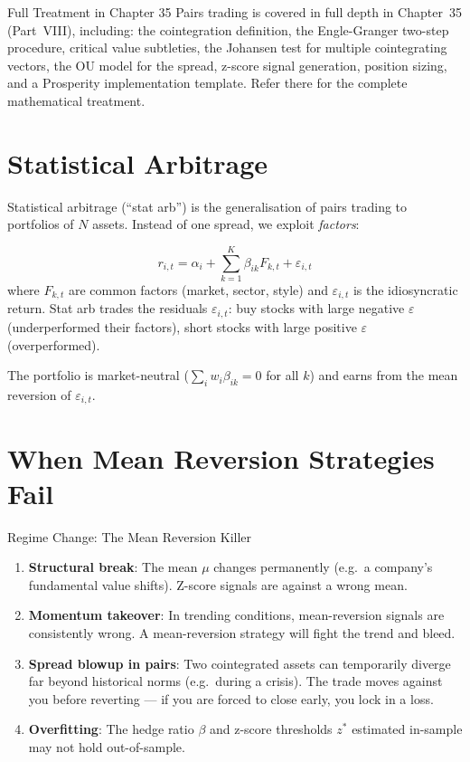 \documentclass[12pt,a4paper,openany]{report}
\theoremstyle{definition}
\begin{document}
\begin{keyconceptbox}{Full Treatment in Chapter 35}
Pairs trading is covered in full depth in Chapter~35 (Part~VIII), including: the cointegration definition, the Engle-Granger two-step procedure, critical value subtleties, the Johansen test for multiple cointegrating vectors, the OU model for the spread, z-score signal generation, position sizing, and a Prosperity implementation template. Refer there for the complete mathematical treatment.
\end{keyconceptbox}

\section{Statistical Arbitrage}

Statistical arbitrage (``stat arb'') is the generalisation of pairs trading to portfolios of $N$ assets. Instead of one spread, we exploit \emph{factors}:

\begin{equation}
  r_{i,t} = \alpha_i + \sum_{k=1}^K \beta_{ik} F_{k,t} + \varepsilon_{i,t}
\end{equation}
where $F_{k,t}$ are common factors (market, sector, style) and $\varepsilon_{i,t}$ is the idiosyncratic return. Stat arb trades the residuals $\varepsilon_{i,t}$: buy stocks with large negative $\varepsilon$ (underperformed their factors), short stocks with large positive $\varepsilon$ (overperformed).

The portfolio is market-neutral ($\sum_i w_i \beta_{ik} = 0$ for all $k$) and earns from the mean reversion of $\varepsilon_{i,t}$.

\section{When Mean Reversion Strategies Fail}

\begin{warningbox}{Regime Change: The Mean Reversion Killer}
\begin{enumerate}[label=\arabic*.]
  \item \textbf{Structural break}: The mean $\mu$ changes permanently (e.g.\ a company's fundamental value shifts). Z-score signals are against a wrong mean.
  \item \textbf{Momentum takeover}: In trending conditions, mean-reversion signals are consistently wrong. A mean-reversion strategy will fight the trend and bleed.
  \item \textbf{Spread blowup in pairs}: Two cointegrated assets can temporarily diverge far beyond historical norms (e.g.\ during a crisis). The trade moves against you before reverting — if you are forced to close early, you lock in a loss.
  \item \textbf{Overfitting}: The hedge ratio $\beta$ and z-score thresholds $z^*$ estimated in-sample may not hold out-of-sample.
\end{enumerate}
\end{warningbox}
\end{document}
